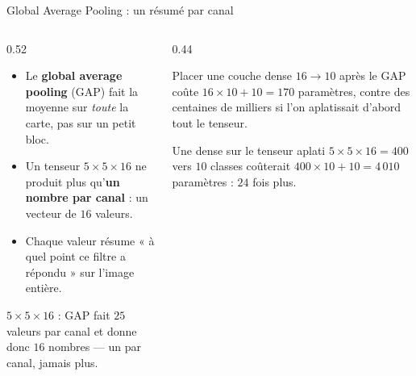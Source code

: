 \begin{frame}{Global Average Pooling : un résumé par canal}
\begin{columns}[t]
\begin{column}{0.52\textwidth}
\begin{itemize}
  \item Le \textbf{global average pooling} (GAP) fait la moyenne sur \emph{toute}
  la carte, pas sur un petit bloc.
  \item Un tenseur $5 \times 5 \times 16$ ne produit plus qu'\textbf{un nombre
  par canal} : un vecteur de $16$ valeurs.
  \item Chaque valeur résume « à quel point ce filtre a répondu » sur l'image entière.
\end{itemize}
\begin{kbox}
$5 \times 5 \times 16$ : GAP fait $25$ valeurs par canal et donne donc
$16$ nombres --- un par canal, jamais plus.
\end{kbox}
\end{column}
\begin{column}{0.44\textwidth}
\begin{ebox}
Placer une couche dense $16 \to 10$ après le GAP coûte
$16 \times 10 + 10 = 170$ paramètres, contre des centaines de milliers si l'on
aplatissait d'abord tout le tenseur.
\end{ebox}
\begin{wbox}
Une dense sur le tenseur aplati $5\times 5\times 16 = 400$ vers $10$ classes
coûterait $400 \times 10 + 10 = 4\,010$ paramètres : $24$ fois plus.
\end{wbox}
\end{column}
\end{columns}
\end{frame}

